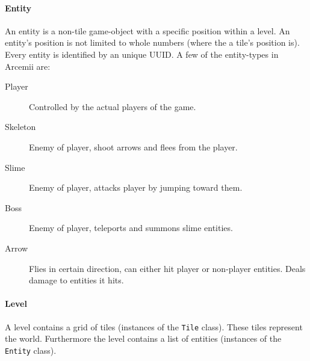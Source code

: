 \documentclass[../main.tex]{subfiles}
\begin{document}
        \paragraph{Entity} An entity is a non-tile game-object with a specific position within a level. An entity's position is not limited to whole numbers (where the a tile's position is). Every entity is identified by an unique UUID. A few of the entity-types in Arcemii are:
        \begin{description}
            \item[Player] Controlled by the actual players of the game.
            \item[Skeleton] Enemy of player, shoot arrows and flees from the player.
            \item[Slime] Enemy of player, attacks player by jumping toward them.
            \item[Boss] Enemy of player, teleports and summons slime entities.
            \item[Arrow] Flies in certain direction, can either hit player or non-player entities. Deals damage to entities it hits.
        \end{description}

        \paragraph{Level}
        A level contains a grid of tiles (instances of the \texttt{Tile} class). These tiles represent the world. Furthermore the level contains a list of entities (instances of the 
        \texttt{Entity} class).
\end{document}

